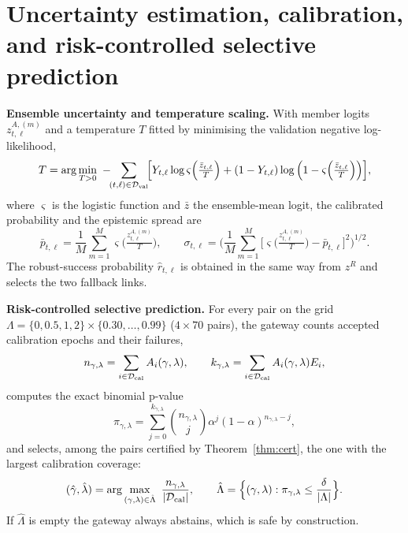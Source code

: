 \section{Uncertainty estimation, calibration, and risk-controlled selective prediction}\label{sec:uq}
\textbf{Ensemble uncertainty and temperature scaling.} With member logits $z^{A,(m)}_{t,\ell}$ and a temperature $T$ fitted by minimising the validation negative log-likelihood,
\begin{equation}\label{eq:temp}
T=\arg\min_{T>0}\ -\!\!\sum_{(t,\ell)\in\mathcal D_{\rm val}}\!\!\Big[Y_{t,\ell}\log\varsigma\Big(\tfrac{\bar z_{t,\ell}}{T}\Big)+(1-Y_{t,\ell})\log\Big(1-\varsigma\Big(\tfrac{\bar z_{t,\ell}}{T}\Big)\Big)\Big],
\end{equation}
where $\varsigma$ is the logistic function and $\bar z$ the ensemble-mean logit, the calibrated probability and the epistemic spread are
\begin{equation}\label{eq:ensemble}
\bar p_{t,\ell}=\frac1M\sum_{m=1}^{M}\varsigma\Big(\tfrac{z^{A,(m)}_{t,\ell}}{T}\Big),\qquad
\sigma_{t,\ell}=\Big(\frac1M\sum_{m=1}^{M}\Big[\varsigma\Big(\tfrac{z^{A,(m)}_{t,\ell}}{T}\Big)-\bar p_{t,\ell}\Big]^2\Big)^{1/2}.
\end{equation}
The robust-success probability $\hat r_{t,\ell}$ is obtained in the same way from $z^R$ and selects the two fallback links.

\textbf{Risk-controlled selective prediction.} For every pair on the grid $\Lambda=\{0,0.5,1,2\}\times\{0.30,\dots,0.99\}$ ($4\times70$ pairs), the gateway counts accepted calibration epochs and their failures,
\begin{equation}\label{eq:counts}
n_{\gamma,\lambda}=\sum_{i\in\mathcal D_{\rm cal}}A_i(\gamma,\lambda),\qquad k_{\gamma,\lambda}=\sum_{i\in\mathcal D_{\rm cal}}A_i(\gamma,\lambda)E_i,
\end{equation}
computes the exact binomial p-value
\begin{equation}\label{eq:pvalue}
\pi_{\gamma,\lambda}=\sum_{j=0}^{k_{\gamma,\lambda}}\binom{n_{\gamma,\lambda}}{j}\alpha^{j}(1-\alpha)^{n_{\gamma,\lambda}-j},
\end{equation}
and selects, among the pairs certified by Theorem~\ref{thm:cert}, the one with the largest calibration coverage:
\begin{equation}\label{eq:select}
(\hat\gamma,\hat\lambda)=\arg\max_{(\gamma,\lambda)\in\hat\Lambda}\ \frac{n_{\gamma,\lambda}}{|\mathcal D_{\rm cal}|},\qquad \hat\Lambda=\Big\{(\gamma,\lambda):\pi_{\gamma,\lambda}\le\frac{\delta}{|\Lambda|}\Big\}.
\end{equation}
If $\hat\Lambda$ is empty the gateway always abstains, which is safe by construction.

